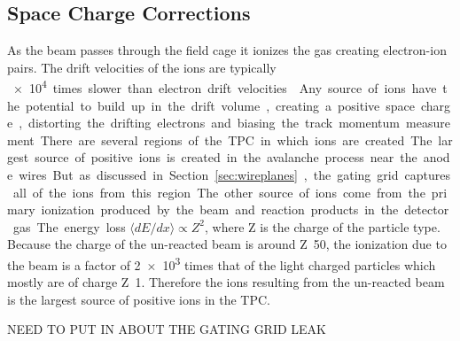 
\subsection{Space Charge Corrections}
\label{sec:spacecharge}


As the beam passes through the field cage it ionizes the gas creating electron-ion pairs. The drift velocities of the ions are typically \SI{e4} times slower than electron drift velocities \cite{blumrol}. Any source of ions have the potential to build up in the drift volume, creating a positive space charge, distorting the drifting electrons and  biasing the track momentum measurement. There are several regions of the TPC in which ions are created. The largest source of positive ions is created in the avalanche process near the anode wires. But as discussed in Section~\ref{sec:wireplanes}, the gating grid captures all of the ions from this region. The other source of ions come from the primary ionization produced by the beam and reaction products in the detector gas. The energy loss  $\langle dE/dx\rangle \propto Z^2$, where Z is the charge of the particle type. Because the charge of the un-reacted beam is around Z~50, the ionization due to the beam is a factor of \num{2e3} times that of the light charged particles which mostly are of charge Z~1. Therefore the ions resulting from the un-reacted beam is the largest source of positive ions in the TPC. 


NEED TO PUT IN ABOUT THE GATING GRID LEAK 
 
 \begin{comment}
 
 \begin{table}[!htb] %
\centering %
\begin{tabular}{
  @{}
  l
  S[table-format=1.2]
  S[table-format=1.2]
  S[table-format=1.2]
  S[table-format=5.2]
  S[table-format=5.2]
  @{}
}
\toprule
Beam Energy Loss  &
 {${}^{132}$Sn} &
 {${}^{124}$Sn} &
 {${}^{112}$Sn} &
 {${}^{108}$Sn} &
  {Avg.}\\
  
\midrule
$\si{\kilo\eV\per\centi\meter}$ & 11.2   &.034  &5.43   &  903   &150     \\
\bottomrule
\end{tabular}

\caption{Average energy loss of each beam.}
\label{tb:beameloss}
\end{table}
\end{comment}


